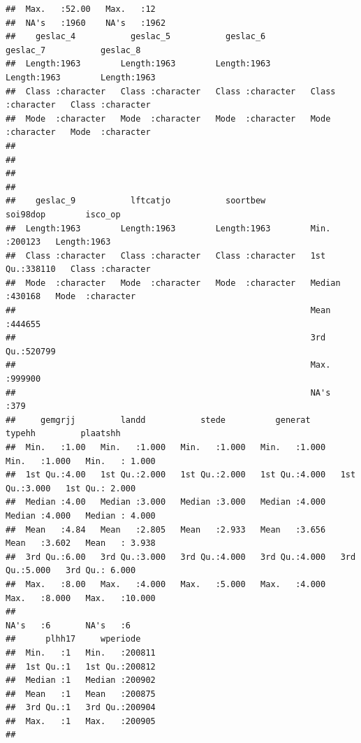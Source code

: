\documentclass[
]{book}
\begin{document}
\begin{verbatim}
##  Max.   :52.00   Max.   :12                                                             
##  NA's   :1960    NA's   :1962                                                           
##    geslac_4           geslac_5           geslac_6           geslac_7           geslac_8        
##  Length:1963        Length:1963        Length:1963        Length:1963        Length:1963       
##  Class :character   Class :character   Class :character   Class :character   Class :character  
##  Mode  :character   Mode  :character   Mode  :character   Mode  :character   Mode  :character  
##                                                                                                
##                                                                                                
##                                                                                                
##                                                                                                
##    geslac_9           lftcatjo           soortbew            soi98dop        isco_op         
##  Length:1963        Length:1963        Length:1963        Min.   :200123   Length:1963       
##  Class :character   Class :character   Class :character   1st Qu.:338110   Class :character  
##  Mode  :character   Mode  :character   Mode  :character   Median :430168   Mode  :character  
##                                                           Mean   :444655                     
##                                                           3rd Qu.:520799                     
##                                                           Max.   :999900                     
##                                                           NA's   :379                        
##     gemgrjj         landd           stede          generat          typehh         plaatshh     
##  Min.   :1.00   Min.   :1.000   Min.   :1.000   Min.   :1.000   Min.   :1.000   Min.   : 1.000  
##  1st Qu.:4.00   1st Qu.:2.000   1st Qu.:2.000   1st Qu.:4.000   1st Qu.:3.000   1st Qu.: 2.000  
##  Median :4.00   Median :3.000   Median :3.000   Median :4.000   Median :4.000   Median : 4.000  
##  Mean   :4.84   Mean   :2.805   Mean   :2.933   Mean   :3.656   Mean   :3.602   Mean   : 3.938  
##  3rd Qu.:6.00   3rd Qu.:3.000   3rd Qu.:4.000   3rd Qu.:4.000   3rd Qu.:5.000   3rd Qu.: 6.000  
##  Max.   :8.00   Max.   :4.000   Max.   :5.000   Max.   :4.000   Max.   :8.000   Max.   :10.000  
##                                                                 NA's   :6       NA's   :6       
##      plhh17     wperiode     
##  Min.   :1   Min.   :200811  
##  1st Qu.:1   1st Qu.:200812  
##  Median :1   Median :200902  
##  Mean   :1   Mean   :200875  
##  3rd Qu.:1   3rd Qu.:200904  
##  Max.   :1   Max.   :200905  
## 
\end{verbatim}
\end{document}
